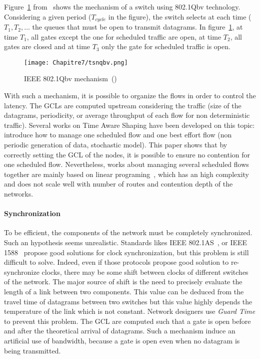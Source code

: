 Figure~\ref{fig:tsnqbv} from~\cite{durr2016no} shows the mechanism of a switch using 802.1Qbv technology. Considering a given period ($T_{cycle}$ in the figure), the switch selects at each time ($T_1 , T_2 , \ldots$ the queues that must be open to transmit datagrams. In figure~\ref{fig:tsnqbv}, at time $T_1$, all gates except the one for scheduled traffic are open, at time $T_2$, all gates are closed and at time $T_3$ only the gate for scheduled traffic is open.

  \begin{figure}
  \begin{center}
  \texttt{[image: Chapitre7/tsnqbv.png]}
  \end{center}
  \caption{IEEE 802.1Qbv mechanism~(\cite{durr2016no})}\label{fig:tsnqbv}
  \end{figure}
      
With such a mechanism, it is possible to organize the flows in order to control the latency. The GCLs are computed upstream considering the traffic (size of the datagrams, periodicity, or average throughput of each flow for non deterministic traffic). Several works on Time Aware Shaping have been developed on this topic: \cite{al2017modeling} introduce how to manage one scheduled flow and one best effort flow (non periodic generation of data, stochastic model). This paper shows that by correctly setting the GCL of the nodes, it is possible to ensure no contention for one scheduled flow. Nevertheless, works about managing several scheduled flows together are mainly based on linear programing~\cite{steiner2018traffic,silviu2017,nayak2017incremental,naresh2016}, which has an high complexity and does not scale well with number of routes and contention depth of the networks.

\paragraph{Synchronization}
To be efficient, the components of the network must be completely synchronized. Such an hypothesis seems unrealistic. Standards likes IEEE 802.1AS~\cite{5741898}, or IEEE 1588~\cite{4579760} propose good solutions for clock synchronization, but this problem is still difficult to solve. Indeed, even if those protocols propose good solution to re-synchronize clocks, there may be some shift between clocks of different switches of the network. The major source of shift is the need to precisely evaluate the length of a link between two components. This value can be deduced from the travel time of datagrams between two switches but this value highly depends the temperature of the link which is not constant. Network designers use {\em Guard Time} to prevent this problem. The GCL are computed such that a gate is open before and after the theoretical arrival of datagrams. Such a mechanism induce an artificial use of bandwidth, because a gate is open even when no datagram is being transmitted.

